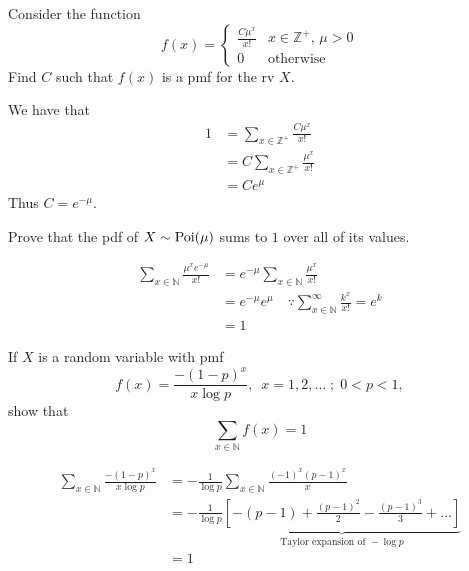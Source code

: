 \documentclass[notoc,notitlepage]{tufte-book}
\begin{document}
\begin{eg}
  Consider the function
  \begin{equation*}
    f(x) = \begin{cases}
      \frac{C \mu^x}{x!} & x \in \mathbb{Z}^+, \, \mu > 0 \\
      0                  & \text{otherwise}
    \end{cases}
  \end{equation*}
  Find $C$ such that $f(x)$ is a pmf for the rv $X$.

  \begin{solution}
    We have that
    \begin{align*}
      1 &= \sum_{x \in \mathbb{Z}^+} \frac{C \mu^x}{x!} \\
        &= C \sum_{x \in \mathbb{Z}^+} \frac{\mu^x}{x!} \\
        &= C e^\mu
    \end{align*}
    Thus $C = e^{- \mu}$.
  \end{solution}
\end{eg}

\begin{ex}
  Prove that the pdf of $X \sim \operatorname{Poi}(\mu)$ sums to $1$ over all of its values.

  \begin{solution}
    \begin{align*}
      \sum_{x \in \mathbb{N}} \frac{\mu^x e^{- \mu}}{x!}
        &= e^{- \mu} \sum_{x \in \mathbb{N}} \frac{\mu^x}{x!} \\
        &= e^{- \mu} e^\mu \quad \because \sum_{x \in \mathbb{N}}^{\infty} \frac{k^x}{x!} = e^k \\
        &= 1
    \end{align*}
  \end{solution}
\end{ex}

\begin{ex}
  If $X$ is a random variable with pmf
  \begin{equation*}
    f(x) = \frac{- (1 - p)^x}{x \log p}, \enspace x = 1, 2, ... \; ; \; 0 < p < 1,
  \end{equation*}
  show that
  \begin{equation*}
    \sum_{x \in \mathbb{N}} f(x) = 1
  \end{equation*}

  \begin{solution}
    \begin{align*}
      \sum_{x \in \mathbb{N}} \frac{- (1 - p)^x}{x \log p}
        &= - \frac{1}{\log p} \sum_{x \in \mathbb{N}} \frac{(-1)^x (p - 1)^x}{x} \\
        &= - \frac{1}{\log p} \underbrace{ \left[ - (p - 1) + \frac{(p - 1)^2}{2} - \frac{(p - 1)^3}{3} + \hdots \right] }_{\text{Taylor expansion of } - \log p} \\
        &= 1
    \end{align*}
  \end{solution}
\end{ex}
\end{document}
